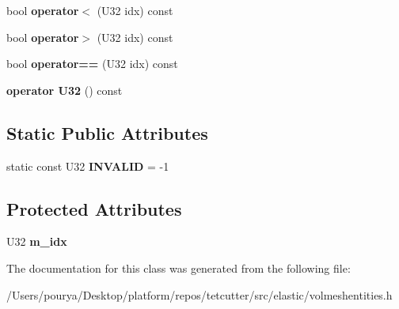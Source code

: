 \begin{DoxyCompactItemize}
\item 
\hypertarget{classps_1_1elastic_1_1BaseLink_acf6f28acf1d30ebd63948b1583d3323a}{}bool {\bfseries operator$<$} (U32 idx) const \label{classps_1_1elastic_1_1BaseLink_acf6f28acf1d30ebd63948b1583d3323a}

\item 
\hypertarget{classps_1_1elastic_1_1BaseLink_a0e023e71db4b8b7224b082cf2431692f}{}bool {\bfseries operator$>$} (U32 idx) const \label{classps_1_1elastic_1_1BaseLink_a0e023e71db4b8b7224b082cf2431692f}

\item 
\hypertarget{classps_1_1elastic_1_1BaseLink_a3787dd9498760d3eb872804990d11318}{}bool {\bfseries operator==} (U32 idx) const \label{classps_1_1elastic_1_1BaseLink_a3787dd9498760d3eb872804990d11318}

\item 
\hypertarget{classps_1_1elastic_1_1BaseLink_aca83fb5611e3a0ec6475761f60e6ff77}{}{\bfseries operator U32} () const \label{classps_1_1elastic_1_1BaseLink_aca83fb5611e3a0ec6475761f60e6ff77}

\end{DoxyCompactItemize}
\subsection*{Static Public Attributes}
\begin{DoxyCompactItemize}
\item 
\hypertarget{classps_1_1elastic_1_1BaseLink_a37307d433d8183e8448b6683c1abcf12}{}static const U32 {\bfseries I\+N\+V\+A\+L\+I\+D} = -\/1\label{classps_1_1elastic_1_1BaseLink_a37307d433d8183e8448b6683c1abcf12}

\end{DoxyCompactItemize}
\subsection*{Protected Attributes}
\begin{DoxyCompactItemize}
\item 
\hypertarget{classps_1_1elastic_1_1BaseLink_a78015f23c6888befc7d6779734b4cda4}{}U32 {\bfseries m\+\_\+idx}\label{classps_1_1elastic_1_1BaseLink_a78015f23c6888befc7d6779734b4cda4}

\end{DoxyCompactItemize}


The documentation for this class was generated from the following file\+:\begin{DoxyCompactItemize}
\item 
/\+Users/pourya/\+Desktop/platform/repos/tetcutter/src/elastic/volmeshentities.\+h\end{DoxyCompactItemize}

